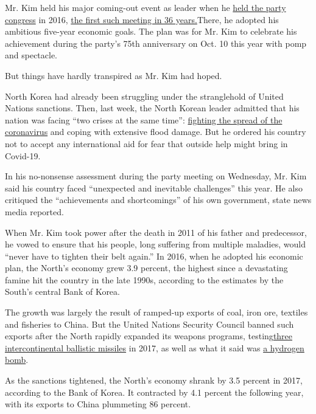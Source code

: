 Mr. Kim held his major coming-out event as leader when he
\href{https://www.nytimes3xbfgragh.onion/2016/05/07/world/asia/north-korea-congress.html}{held
the party congress} in 2016,
\href{https://www.nytimes3xbfgragh.onion/2016/05/06/world/asia/north-korea-congress.html}{the
first such meeting in 36 years.}There, he adopted his ambitious
five-year economic goals. The plan was for Mr. Kim to celebrate his
achievement during the party's 75th anniversary on Oct. 10 this year
with pomp and spectacle.

But things have hardly transpired as Mr. Kim had hoped.

North Korea had already been struggling under the stranglehold of United
Nations sanctions. Then, last week, the North Korean leader admitted
that his nation was facing ``two crises at the same time'':
\href{https://www.nytimes3xbfgragh.onion/2020/03/31/world/asia/north-korea-coronavirus.html}{fighting
the spread of the coronavirus} and coping with extensive flood damage.
But he ordered his country not to accept any international aid for fear
that outside help might bring in Covid-19.

In his no-nonsense assessment during the party meeting on Wednesday, Mr.
Kim said his country faced ``unexpected and inevitable challenges'' this
year. He also critiqued the ``achievements and shortcomings'' of his own
government, state news media reported.

When Mr. Kim took power after the death in 2011 of his father and
predecessor, he vowed to ensure that his people, long suffering from
multiple maladies, would ``never have to tighten their belt again.'' In
2016, when he adopted his economic plan, the North's economy grew 3.9
percent, the highest since a devastating famine hit the country in the
late 1990s, according to the estimates by the South's central Bank of
Korea.

The growth was largely the result of ramped-up exports of coal, iron
ore, textiles and fisheries to China. But the United Nations Security
Council banned such exports after the North rapidly expanded its weapons
programs,
testing\href{https://www.nytimes3xbfgragh.onion/2017/11/30/world/asia/north-korea-missile-test.html}{three
intercontinental ballistic missiles} in 2017, as well as what it said
was
\href{https://www.nytimes3xbfgragh.onion/2017/09/03/world/asia/north-korea-tremor-possible-6th-nuclear-test.html}{a
hydrogen bomb}.

As the sanctions tightened, the North's economy shrank by 3.5 percent in
2017, according to the Bank of Korea. It contracted by 4.1 percent the
following year, with its exports to China plummeting 86 percent.

